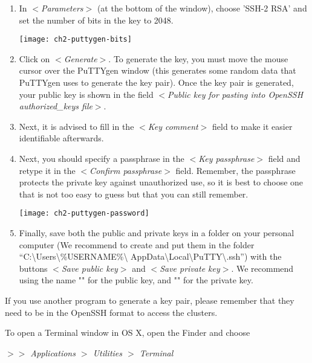   \begin{enumerate}
    \item  In $<$\emph{Parameters}$>$ (at the bottom of the window), choose
      'SSH-2 RSA' and set the number of bits in the key to 2048.

    \texttt{[image: ch2-puttygen-bits]}

    \item  Click on $<$\emph{Generate}$>$. To generate the key, you must move
      the mouse cursor over the PuTTYgen window (this generates some random
      data that PuTTYgen uses to generate the key pair). Once the key pair is
      generated, your public key is shown in the field $<$\emph{Public key for pasting into OpenSSH authorized\_keys file}$>$.
    \item  Next, it is advised to fill in the $<$\emph{Key comment}$>$ field
      to make it easier identifiable afterwards.
    \item  Next, you should specify a passphrase in the $<$\emph{Key passphrase}$>$
      field and retype it in the $<$\emph{Confirm passphrase}$>$ field.
      Remember, the passphrase protects the private key against unauthorized
      use, so it is best to choose one that is not too easy to guess but that
      you can still remember.

    \texttt{[image: ch2-puttygen-password]}

    \item  Finally, save both the public and private keys in a folder on your
      personal computer (We recommend to create and put them in the folder
      ``C:\textbackslash Users\textbackslash \%USERNAME\%\textbackslash
      AppData\textbackslash Local\textbackslash PuTTY\textbackslash .ssh'')
      with the buttons $<$\emph{Save public key}$>$ and $<$\emph{Save private key}$>$.
      We recommend using the name "" for the public key,
      and "" for the private key.
  \end{enumerate}

  If you use another program to generate a key pair, please remember that they
  need to be in the OpenSSH format to access the \hpc clusters.
\fi %

\ifmac
  To open a Terminal window in OS X, open the Finder and choose

  \emph{$>$$>$ Applications $>$ Utilities $>$ Terminal}
\fi

